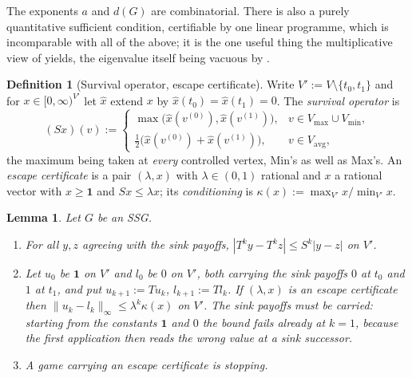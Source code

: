 \documentclass[11pt]{article}
\theoremstyle{plain}
\newtheorem{lemma}[theorem]{Lemma}
\theoremstyle{definition}
\newtheorem{definition}[theorem]{Definition}
\newcommand{\Vmax}{V_{\max}}
\newcommand{\Vmin}{V_{\min}}
\newcommand{\Vavg}{V_{\mathrm{avg}}}
\newcommand{\bbone}{\mathbf{1}}
\begin{document}
The exponents $a$ and $d(G)$ are combinatorial. There is also a purely
quantitative sufficient condition, certifiable by one linear programme,
which is incomparable with all of the above; it is the one useful thing
the multiplicative view of  yields, the eigenvalue itself
being vacuous by .

\begin{definition}[Survival operator, escape certificate]\label{def:survival}
Write $V':=V\setminus\{t_0,t_1\}$ and for $x\in[0,\infty)^{V'}$ let
$\hat x$ extend $x$ by $\hat x(t_0)=\hat x(t_1)=0$. The \emph{survival
operator} is
\[
  (Sx)(v):=\begin{cases}
    \max\bigl(\hat x(v^{(0)}),\hat x(v^{(1)})\bigr), & v\in\Vmax\cup\Vmin,\\[2pt]
    \tfrac12\bigl(\hat x(v^{(0)})+\hat x(v^{(1)})\bigr), & v\in\Vavg,
  \end{cases}
\]
the maximum being taken at \emph{every} controlled vertex, Min's as well
as Max's. An \emph{escape certificate} is a pair $(\lambda,x)$ with
$\lambda\in(0,1)$ rational and $x$ a rational vector with $x\ge\bbone$
and $Sx\le\lambda x$; its \emph{conditioning} is
$\kappa(x):=\max_{V'}x/\min_{V'}x$.
\end{definition}

\begin{lemma}\label{lem:survival}
Let $G$ be an SSG.
\begin{enumerate}[label=(\alph*),leftmargin=2.2em]
\item For all $y,z$ agreeing with the sink payoffs,
      $|T^ky-T^kz|\le S^k|y-z|$ on $V'$.
\item Let $u_0$ be $\bbone$ on $V'$ and $l_0$ be $0$ on $V'$, both
      carrying the sink payoffs $0$ at $t_0$ and $1$ at $t_1$, and put
      $u_{k+1}:=Tu_k$, $l_{k+1}:=Tl_k$. If $(\lambda,x)$ is an escape
      certificate then $\|u_k-l_k\|_\infty\le\lambda^{k}\kappa(x)$ on
      $V'$. The sink payoffs must be carried: starting from the constants
      $\bbone$ and $0$ the bound fails already at $k=1$, because the
      first application then reads the wrong value at a sink successor.
\item A game carrying an escape certificate is stopping.
\end{enumerate}
\end{lemma}
\end{document}
